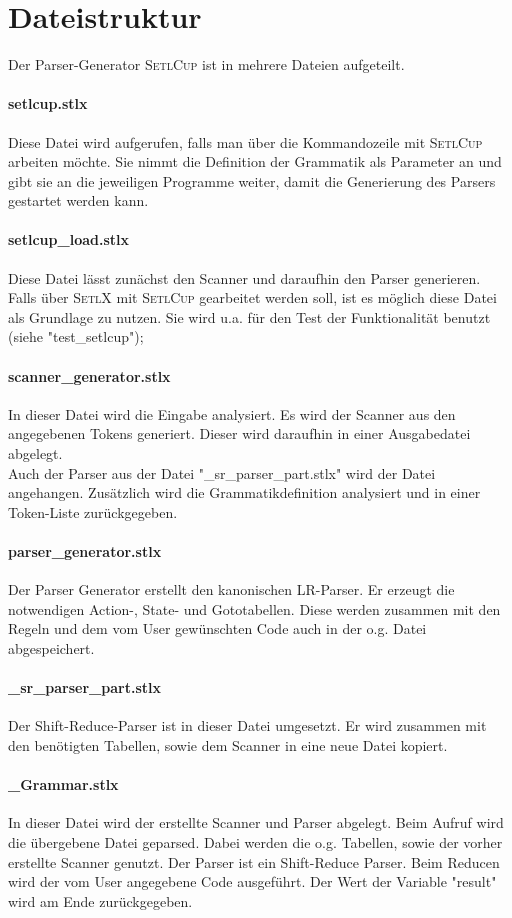 \section{Dateistruktur}
Der Parser-Generator \textsc{SetlCup} ist in mehrere Dateien aufgeteilt.
\paragraph{setlcup.stlx} Diese Datei wird aufgerufen, falls man über die Kommandozeile mit \textsc{SetlCup} arbeiten möchte. Sie nimmt die Definition der Grammatik als Parameter an und gibt sie an die jeweiligen Programme weiter, damit die Generierung des Parsers gestartet werden kann.
\paragraph{setlcup\_load.stlx} Diese Datei lässt zunächst den Scanner und daraufhin den Parser generieren. Falls über \textsc{SetlX} mit \textsc{SetlCup} gearbeitet werden soll, ist es möglich diese Datei als Grundlage zu nutzen. Sie wird u.a. für den Test der Funktionalität benutzt (siehe "test\_setlcup");
\paragraph{scanner\_generator.stlx} In dieser Datei wird die Eingabe analysiert. Es wird der Scanner aus den angegebenen Tokens generiert. Dieser wird daraufhin in einer Ausgabedatei abgelegt. \\
Auch der Parser aus der Datei "\_sr\_parser\_part.stlx" wird der Datei angehangen. Zusätzlich wird die Grammatikdefinition analysiert und  in einer Token-Liste zurückgegeben.
\paragraph{parser\_generator.stlx} Der Parser Generator erstellt den kanonischen LR-Parser. Er erzeugt die notwendigen Action-, State- und Gototabellen. Diese werden zusammen mit den Regeln und dem vom User gewünschten Code auch in der o.g. Datei abgespeichert. 
\paragraph{\_sr\_parser\_part.stlx} Der Shift-Reduce-Parser ist in dieser Datei umgesetzt. Er wird zusammen mit den benötigten Tabellen, sowie dem Scanner in eine neue Datei kopiert. 
\paragraph{\_Grammar.stlx} In dieser Datei wird der erstellte Scanner und Parser abgelegt. Beim Aufruf wird die übergebene Datei geparsed. Dabei werden die o.g. Tabellen, sowie der vorher erstellte Scanner genutzt. Der Parser ist ein Shift-Reduce Parser. Beim Reducen wird der vom User angegebene Code ausgeführt. Der Wert der Variable "result" wird am Ende zurückgegeben.
